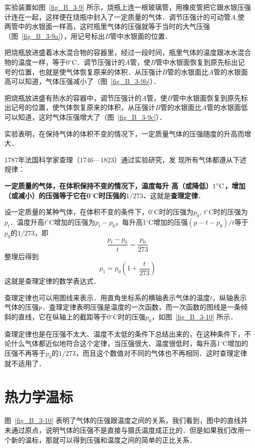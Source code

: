 实验装置如图~\ref{fig_B_3-9} 所示，烧瓶上连一根玻璃管，用橡皮管把它跟水银压强计连在一起，这样便在烧瓶中封入了一定质量的气体．调节压强计的可动管$A$,使两管中的水银面一样高，这时瓶里气体的压强就等于当时的大气压强（图~\ref{fig_B_3-9a}），用记号标出$B$管中水银面的位置．

把烧瓶放进盛着冰水混合物的容器里，经过一段时间，瓶里气体的温度跟冰水混合物的温度一样，等于0$^\circ$C．调节压强计的$A$管，使$B$管中水银面恢复到原先标出记号的位置，也就是使气体恢复原来的体积．从压强计$B$管的水银面比$A$管的水银面高可以知道，气体压强减小了（图~\ref{fig_B_3-9b}）．

把烧瓶放进盛有热水的容器中，调节压强计的$A$管，使$B$管中水银面恢复到原先标出记号的位置，使气体恢复原来的体积，从压强计$B$管的水银面比$A$管的水银面低可以知道，这时气体压强增大了（图~\ref{fig_B_3-9c}）．

实验表明，在保持气体的体积不变的情况下，一定质量气体的压强随度的升高而增大．

1787年法国科学家查理（1746—1823）通过实验研究，发
现所有气体都遵从下述规律：

\textbf{一定质量的气体，在体积保持不变的情况下，温度每升
高（或降低）$1^\circ{\rm C}$，增加（或减小）的压强等于它在0$^\circ$C时压强的$1/273$．}这就是\textbf{查理定律}．

设一定质量的某种气体，在体积不变的条件下，0$^\circ$C时的压强为$p_0$, $t^\circ$C时的压强为$p_t$．温度升高$t^\circ$C增加的压强为$p_t-p_0$，每升高1$^\circ$C增加的压强$(p-t-p_0)/t$等于$p_0$的$1/273$，即
\[\frac{p_t-p_0}{t}=\frac{p_0}{273} \]
整理后得到
\[p_1=p_0 \left(1+\frac{t}{273}\right)\]
这就是查理定律的数学表达式．

查理定律也可以用图线来表示．用直角坐标系的横轴表示气体的温度$t$，纵轴表示气体的压强$p$．査理定律表明压强是温度的一次函数，而一次函数的图线是一条倾斜的直线，它在纵轴上的截距等于0$^\circ$C时的压强$p_0$，如图~\ref{fig_B_3-10} 所示．

查理定律也是在压强不太大、温度不太低的条件下总结出来的，在这种条件下，不论什么气体都近似地符合这个定律，当压强很大、温度很低时，每升高1$^\circ$C增加的压强不再等于$p_0$的$1/273$，而且这个数值对不同的气体也不再相同．这时查理定律就不适用了．


\section{热力学温标}
图~\ref{fig_B_3-10} 表明了气体的压强跟温度之间的关系，我们看到，图中的直线并未通过原点，说明气体的压强不是直接与摄氏温度成正比的．但是如果我们改用一个新的温标，那就可以得到压强和温度之间的简单的正比关系．

